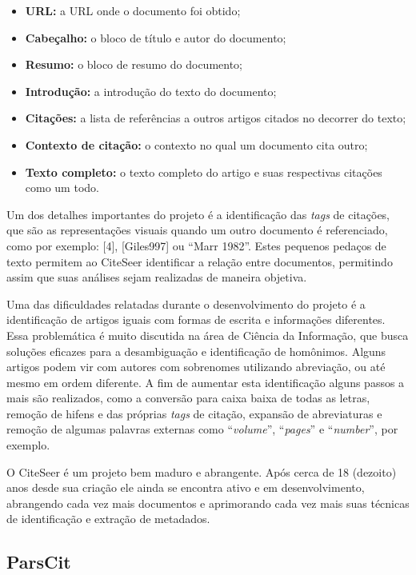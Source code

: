 \begin{itemize}
    \item \textbf{URL:} a URL onde o documento foi obtido;
    \item \textbf{Cabeçalho:} o bloco de título e autor do documento;
    \item \textbf{Resumo:} o bloco de resumo do documento;
    \item \textbf{Introdução:} a introdução do texto do documento;
    \item \textbf{Citações:} a lista de referências a outros artigos citados no decorrer do texto;
    \item \textbf{Contexto de citação:} o contexto no qual um documento cita outro;
    \item \textbf{Texto completo:} o texto completo do artigo e suas respectivas citações como um todo.
\end{itemize}

Um dos detalhes importantes do projeto é a identificação das \textit{tags} de citações, que são as representações visuais quando um outro documento é referenciado, como por exemplo: [4], [Giles997] ou ``Marr 1982''. Estes pequenos pedaços de texto permitem ao CiteSeer identificar a relação entre documentos, permitindo assim que suas análises sejam realizadas de maneira objetiva.

Uma das dificuldades relatadas durante o desenvolvimento do projeto é a identificação de artigos iguais com formas de escrita e informações diferentes. Essa problemática é muito discutida na área de Ciência da Informação, que busca soluções eficazes para a desambiguação e identificação de homônimos. Alguns artigos podem vir com autores com sobrenomes utilizando abreviação, ou até mesmo em ordem diferente. A fim de aumentar esta identificação alguns passos a mais são realizados, como a conversão para caixa baixa de todas as letras, remoção de hifens e das próprias \textit{tags} de citação, expansão de abreviaturas e remoção de algumas palavras externas como ``\textit{volume}'', ``\textit{pages}'' e ``\textit{number}'', por exemplo.

O CiteSeer é um projeto bem maduro e abrangente. Após cerca de 18 (dezoito) anos desde sua criação ele ainda se encontra ativo e em desenvolvimento, abrangendo cada vez mais documentos e aprimorando cada vez mais suas técnicas de identificação e extração de metadados.

\subsection{ParsCit}
\label{ssec:parscit}

